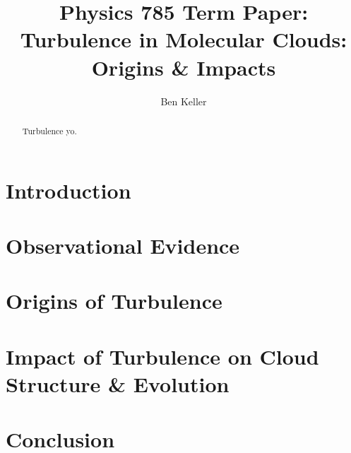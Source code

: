 \documentclass[12pt,usenatbib]{article}
\begin{document}
\title{Physics 785 Term Paper: Turbulence in Molecular Clouds: Origins \&
Impacts}
\author{Ben Keller}
\maketitle
\newpage
\begin{abstract}
	Turbulence yo.
\end{abstract}
\section{Introduction}
\section{Observational Evidence}
\section{Origins of Turbulence}
\section{Impact of Turbulence on Cloud Structure \& Evolution}
\section{Conclusion}


\end{document}

